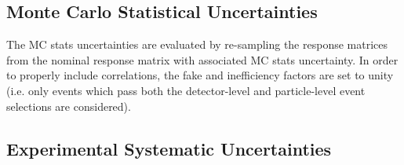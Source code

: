 \subsection{Monte Carlo Statistical Uncertainties}
\label{sec:gbb-systs:MCstat}

The MC stats uncertainties are evaluated by re-sampling the response matrices from the nominal response matrix with associated MC stats uncertainty. In order to properly include correlations, the fake and inefficiency factors are set to unity (i.e. only events which pass both the detector-level and particle-level event selections are considered).

\subsection{Experimental Systematic Uncertainties}
\label{sec:gbb-systs:exp}

